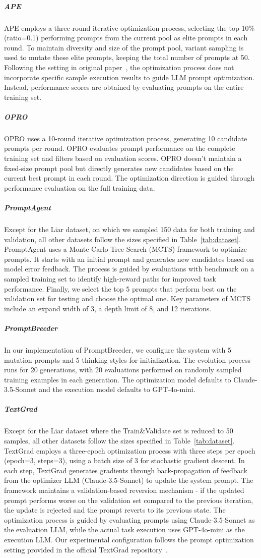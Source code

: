 \subparagraph{APE}
APE employs a three-round iterative optimization process, selecting the top 10\% (ratio=0.1) performing prompts from the current pool as elite prompts in each round. To maintain diversity and size of the prompt pool, variant sampling is used to mutate these elite prompts, keeping the total number of prompts at 50. Following the setting in original paper~\cite{yong2023ape}, the optimization process does not incorporate specific sample execution results to guide LLM prompt optimization. Instead, performance scores are obtained by evaluating prompts on the entire training set.

\subparagraph{OPRO}
OPRO uses a 10-round iterative optimization process, generating 10 candidate prompts per round. OPRO evaluates prompt performance on the complete training set and filters based on evaluation scores. OPRO doesn't maintain a fixed-size prompt pool but directly generates new candidates based on the current best prompt in each round. The optimization direction is guided through performance evaluation on the full training data.

\subparagraph{PromptAgent}
Except for the Liar dataset, on which we sampled 150 data for both training and validation, all other datasets follow the sizes specified in Table~\ref{tab:dataset}. PromptAgent uses a Monte Carlo Tree Search (MCTS) framework to optimize prompts. It starts with an initial prompt and generates new candidates based on model error feedback. The process is guided by evaluations with benchmark on a sampled training set to identify high-reward paths for improved task performance. Finally, we select the top 5 prompts that perform best on the validation set for testing and choose the optimal one. Key parameters of MCTS include an expand width of 3, a depth limit of 8, and 12 iterations. 

\subparagraph{PromptBreeder}
In our implementation of PromptBreeder, we configure the system with 5 mutation prompts and 5 thinking styles for initialization. The evolution process runs for 20 generations, with 20 evaluations performed on randomly sampled training examples in each generation. The optimization model defaults to Claude-3.5-Sonnet and the execution model defaults to GPT-4o-mini.

\subparagraph{TextGrad}
Except for the Liar dataset where the Train\&Validate set is reduced to 50 samples, all other datasets follow the sizes specified in Table~\ref{tab:dataset}. TextGrad employs a three-epoch optimization process with three steps per epoch (epoch=3, steps=3), using a batch size of 3 for stochastic gradient descent. In each step, TextGrad generates gradients through back-propagation of feedback from the optimizer LLM (Claude-3.5-Sonnet) to update the system prompt. The framework maintains a validation-based reversion mechanism - if the updated prompt performs worse on the validation set compared to the previous iteration, the update is rejected and the prompt reverts to its previous state. The optimization process is guided by evaluating prompts using Claude-3.5-Sonnet as the evaluation LLM, while the actual task execution uses GPT-4o-mini as the execution LLM. Our experimental configuration follows the prompt optimization setting provided in the official TextGrad repository~\cite{mert2024textgrad}.

